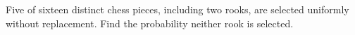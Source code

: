 Five of sixteen distinct chess pieces, including two rooks, are selected uniformly without replacement. Find the probability neither rook is selected.
